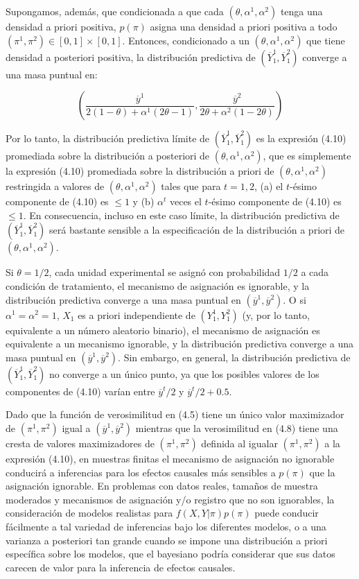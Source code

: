 \documentclass[12pt,a4paper]{article}
\begin{document}
Supongamos, además, que condicionada a que cada $(\theta, \alpha^1, \alpha^2)$ tenga una densidad a priori positiva, $p(\pi)$ asigna una densidad a priori positiva a todo $(\pi^1, \pi^2) \in [0,1] \times [0,1]$. Entonces, condicionado a un $(\theta, \alpha^1, \alpha^2)$ que tiene densidad a posteriori positiva, la distribución predictiva de $(\overline{Y}_1^1, \overline{Y}_1^2)$ converge a una masa puntual en:

\begin{equation}\label{eq:4.10}
\left( \frac{\overline{y}^1}{2(1-\theta) + \alpha^1(2\theta - 1)}, \frac{\overline{y}^2}{2\theta + \alpha^2(1-2\theta)} \right) \tag{4.10}
\end{equation}

Por lo tanto, la distribución predictiva límite de $(\overline{Y}_1^1, \overline{Y}_1^2)$ es la expresión (4.10) promediada sobre la distribución a posteriori de $(\theta, \alpha^1, \alpha^2)$, que es simplemente la expresión (4.10) promediada sobre la distribución a priori de $(\theta, \alpha^1, \alpha^2)$ restringida a valores de $(\theta, \alpha^1, \alpha^2)$ tales que para $t=1,2$, (a) el $t$-ésimo componente de (4.10) es $\le 1$ y (b) $\alpha^t$ veces el $t$-ésimo componente de (4.10) es $\le 1$. En consecuencia, incluso en este caso límite, la distribución predictiva de $(\overline{Y}_1^1, \overline{Y}_1^2)$ será bastante sensible a la especificación de la distribución a priori de $(\theta, \alpha^1, \alpha^2)$.

Si $\theta = 1/2$, cada unidad experimental se asignó con probabilidad $1/2$ a cada condición de tratamiento, el mecanismo de asignación es ignorable, y la distribución predictiva converge a una masa puntual en $(\overline{y}^1, \overline{y}^2)$. O si $\alpha^1 = \alpha^2 = 1$, $X_1$ es a priori independiente de $(Y_1^1, Y_1^2)$ (y, por lo tanto, equivalente a un número aleatorio binario), el mecanismo de asignación es equivalente a un mecanismo ignorable, y la distribución predictiva converge a una masa puntual en $(\overline{y}^1, \overline{y}^2)$. Sin embargo, en general, la distribución predictiva de $(\overline{Y}_1^1, \overline{Y}_1^2)$ no converge a un único punto, ya que los posibles valores de los componentes de (4.10) varían entre $\overline{y}^t/2$ y $\overline{y}^t/2 + 0.5$.

Dado que la función de verosimilitud en (4.5) tiene un único valor maximizador de $(\pi^1, \pi^2)$ igual a $(\overline{y}^1, \overline{y}^2)$ mientras que la verosimilitud en (4.8) tiene una cresta de valores maximizadores de $(\pi^1, \pi^2)$ definida al igualar $(\pi^1, \pi^2)$ a la expresión (4.10), en muestras finitas el mecanismo de asignación no ignorable conducirá a inferencias para los efectos causales más sensibles a $p(\pi)$ que la asignación ignorable. En problemas con datos reales, tamaños de muestra moderados y mecanismos de asignación y/o registro que no son ignorables, la consideración de modelos realistas para $f(X,Y|\pi)p(\pi)$ puede conducir fácilmente a tal variedad de inferencias bajo los diferentes modelos, o a una varianza a posteriori tan grande cuando se impone una distribución a priori específica sobre los modelos, que el bayesiano podría considerar que sus datos carecen de valor para la inferencia de efectos causales.
\end{document}

